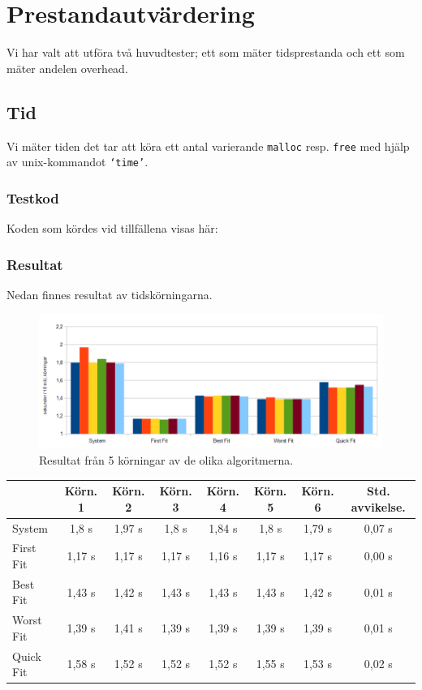\documentclass[a4paper,10pt,titlepage]{article}
\begin{document}
\newpage
\section{Prestandautvärdering}


Vi har valt att utföra två huvudtester; ett som mäter tidsprestanda och ett som mäter andelen overhead.

\subsection{Tid}

Vi mäter tiden det tar att köra ett antal varierande \texttt{malloc} resp. \texttt{free} med hjälp av unix-kommandot \texttt{`time'}.


\subsubsection{Testkod}

Koden som kördes vid tillfällena visas här:

\scriptsize{}
\normalsize

\subsubsection{Resultat}

Nedan finnes resultat av tidskörningarna.
\begin{figure}[H]
	\includegraphics[width=\textwidth]{time.png}
	\caption{Resultat från 5 körningar av de olika algoritmerna.}
\end{figure}
\begin{tabular}{| l | c | c | c | c | c | c | c |}
		\hline
		 & Körn. 1	& Körn. 2	& Körn. 3	& Körn. 4	& Körn. 5	& Körn. 6	& Std. avvikelse. \\
		\hline
		System		& 1,8 s			& 1,97 s	& 1,8 s		& 1,84 s	& 1,8 s		& 1,79 s	& 0,07 s \\
		First Fit	& 1,17 s		& 1,17 s	& 1,17 s	& 1,16 s	& 1,17 s	& 1,17 s	& 0,00 s \\
		Best Fit	& 1,43 s		& 1,42 s	& 1,43 s	& 1,43 s	& 1,43 s	& 1,42 s	& 0,01 s \\
		Worst Fit	& 1,39 s		& 1,41 s	& 1,39 s	& 1,39 s	& 1,39 s	& 1,39 s	& 0,01 s \\
		Quick Fit	& 1,58 s		& 1,52 s	& 1,52 s	& 1,52 s	& 1,55 s	& 1,53 s	& 0,02 s \\
		\hline
\end{tabular}
\end{document}
